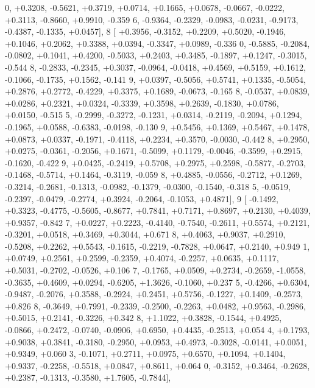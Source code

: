 \begin{DoxyCode}
      0, +0.3208, -0.5621, +0.3719, +0.0714, +0.1665, +0.0678, -0.0667, -0.0222, +0.3113, -0.8660, +0.9910, -0.359
      6, -0.9364, -0.2329, -0.0983, -0.0231, -0.9173, -0.4387, -0.1335, +0.0457],
8 [ +0.3956, -0.3152, +0.2209, +0.5020, -0.1946, +0.1046, +0.2062, +0.3388, +0.0394, -0.3347, +0.0989, -0.336
      0, -0.5885, -0.2084, -0.0802, +0.1041, +0.4200, -0.5033, +0.2403, +0.3485, -0.1897, +0.1247, -0.3015, -0.544
      8, -0.2833, -0.2345, +0.3037, -0.0964, -0.0418, +0.4569, +0.5159, +0.1612, -0.1066, -0.1735, +0.1562, -0.141
      9, +0.0397, -0.5056, +0.5741, +0.1335, -0.5054, +0.2876, +0.2772, -0.4229, +0.3375, +0.1689, -0.0673, -0.165
      8, -0.0537, +0.0839, +0.0286, +0.2321, +0.0324, -0.3339, +0.3598, +0.2639, -0.1830, +0.0786, +0.0150, -0.515
      5, -0.2999, -0.3272, -0.1231, +0.0314, -0.2119, -0.2094, +0.1294, -0.1965, +0.0588, -0.6383, -0.0198, -0.130
      9, +0.5456, +0.1369, +0.5467, +0.1478, +0.0873, +0.0337, -0.1971, -0.4118, +0.2234, +0.3570, -0.0030, -0.442
      8, +0.2950, +0.0275, -0.0361, -0.2056, +0.1671, -0.5099, +0.1179, -0.0046, -0.3599, +0.2915, -0.1620, -0.422
      9, +0.0425, -0.2419, +0.5708, +0.2975, +0.2598, -0.5877, -0.2703, -0.1468, -0.5714, +0.1464, -0.3119, -0.059
      8, +0.4885, -0.0556, -0.2712, +0.1269, -0.3214, -0.2681, -0.1313, -0.0982, -0.1379, -0.0300, -0.1540, -0.318
      5, -0.0519, -0.2397, -0.0479, -0.2774, +0.3924, -0.2064, -0.1053, +0.4871],
9 [ -0.1492, +0.3323, -0.4775, -0.5605, -0.8677, +0.7841, +0.7171, +0.8697, +0.2130, +0.4039, +0.9357, -0.842
      7, +0.0227, +0.2223, -0.4140, -0.7540, -0.2611, +0.5574, +0.2121, -0.3201, +0.0518, +0.3469, +0.3044, +0.671
      8, +0.4063, +0.9037, +0.2910, -0.5208, +0.2262, +0.5543, -0.1615, -0.2219, -0.7828, +0.0647, +0.2140, +0.949
      1, +0.0749, +0.2561, +0.2599, -0.2359, +0.4074, -0.2257, +0.0635, +0.1117, +0.5031, -0.2702, -0.0526, +0.106
      7, -0.1765, +0.0509, +0.2734, -0.2659, -1.0558, -0.3635, +0.4609, +0.0294, -0.6205, +1.3626, -0.1060, +0.237
      5, -0.4266, +0.6304, -0.9487, -0.2076, +0.3588, -0.2924, +0.2451, +0.5756, -0.1227, +0.1409, -0.2573, +0.826
      8, -0.3649, +0.7991, -0.2339, -0.2500, -0.2263, +0.0482, +0.9563, -0.2986, +0.5015, +0.2141, -0.3226, +0.342
      8, +1.1022, +0.3828, -0.1544, +0.4925, -0.0866, +0.2472, -0.0740, -0.0906, +0.6950, +0.4435, -0.2513, +0.054
      4, +0.1793, +0.9038, +0.3841, -0.3180, -0.2950, +0.0953, +0.4973, -0.3028, -0.0141, +0.0051, +0.9349, +0.060
      3, -0.1071, +0.2711, +0.0975, +0.6570, +0.1094, +0.1404, +0.9337, -0.2258, -0.5518, +0.0847, +0.8611, +0.064
      0, -0.3152, +0.3464, -0.2628, +0.2387, -0.1313, -0.3580, +1.7605, -0.7844],

\end{DoxyCode}
